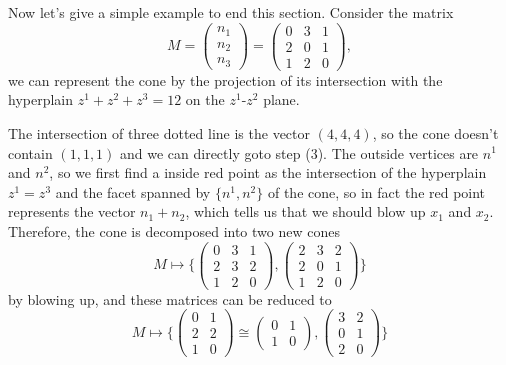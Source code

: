 \documentclass[12pt]{article}
\theoremstyle{definition}
\theoremstyle{plain}
\begin{document}
Now let's give a simple example to end this section. Consider the matrix
\[
	M=\left(
		\begin{array}{ccc}
			n_1 \\
			n_2 \\
			n_3
		\end{array}
	\right)
	=\left(
		\begin{array}{ccc}
			0 & 3 & 1 \\
			2 & 0 & 1 \\
			1 & 2 & 0
		\end{array}
	\right),
\]
we can represent the cone by the projection of its intersection with 
the hyperplain $z^1+z^2+z^3=12$ on the $z^1$-$z^2$ plane.
\begin{center}
\end{center}
The intersection of three dotted line is the vector $(4,4,4)$, 
so the cone doesn't contain $(1,1,1)$ and we can directly goto step (3).
The outside vertices are $n^1$ and $n^2$, so we first find a inside red point 
as the intersection of the hyperplain 
$z^1=z^3$ and the facet spanned by $\{n^1,n^2\}$ of the cone, 
so in fact the red point represents the vector $n_1+n_2$, 
which tells us that we should blow up $x_1$ and $x_2$.
Therefore, the cone is decomposed into two new cones 
\[
	M\mapsto \biggl\{
		\begin{pmatrix}
			0&3&1\\
			2&3&2\\
			1&2&0
		\end{pmatrix},
		\begin{pmatrix}
			2&3&2\\
			2&0&1\\
			1&2&0
		\end{pmatrix}
	\biggr\}
\] 
by blowing up, and these matrices can be reduced to
\[
	M\mapsto \biggl\{
		\begin{pmatrix}
			0&1\\
			2&2\\
			1&0
		\end{pmatrix}\cong
		\begin{pmatrix}
			0&1\\
			1&0
		\end{pmatrix},
		\begin{pmatrix}
			3&2\\
			0&1\\
			2&0
		\end{pmatrix}
	\biggr\}
\]
\end{document}
